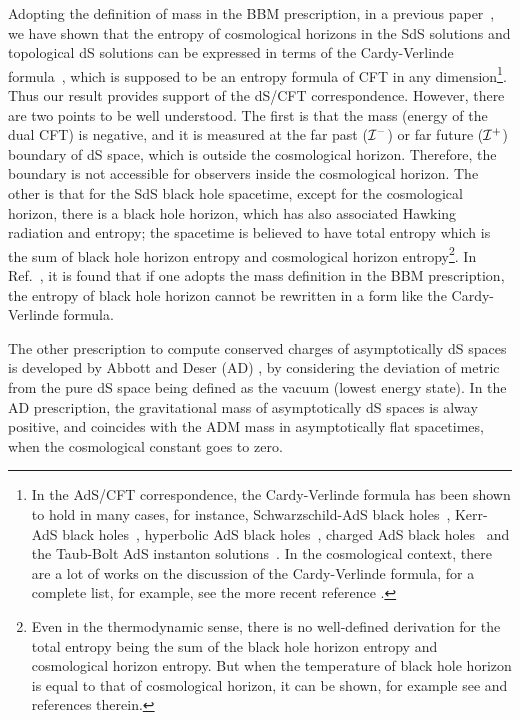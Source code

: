 \documentclass[a4paper,12pt]{article}
\begin{document}
Adopting the definition of mass in the BBM prescription, in a previous paper~\cite{Cai1},
we have shown that the entropy of cosmological horizons in the SdS  solutions
and topological dS solutions can be expressed in terms of the Cardy-Verlinde 
formula~\cite{Verl}, which is supposed to be an entropy formula of CFT in any 
dimension\footnote{In the AdS/CFT correspondence, the Cardy-Verlinde formula has
been shown to hold in many cases, for instance, Schwarzschild-AdS black holes~\cite{Verl},
Kerr-AdS black holes~\cite{Klem2}, hyperbolic AdS black holes~\cite{Cai2}, charged AdS
black holes~\cite{Cai2} and the Taub-Bolt AdS instanton solutions~\cite{Birm}. In the
cosmological context, there are a lot of works on the discussion of the Cardy-Verlinde
formula, for a complete list, for example, see the more recent reference \cite{Myung1}.}.
Thus our result provides support of the dS/CFT correspondence. However, there are two
points to be well understood. The first is that the mass (energy of the dual CFT) is 
negative, and it is measured at the far past (${\cal I}^-$) or far future (${\cal I}^+$)
 boundary of dS space, which is outside the cosmological horizon. Therefore, the boundary is
not accessible for observers inside the cosmological horizon. The other is that for 
the SdS black hole spacetime, except for the cosmological horizon,
there is a black hole horizon, which has also associated  Hawking radiation and 
entropy; the spacetime is believed to have total entropy which is the sum of black hole horizon
entropy and cosmological horizon entropy\footnote{Even in the thermodynamic sense,
there is no well-defined derivation for the total entropy being the sum of the black hole
horizon entropy and cosmological horizon entropy. But when the temperature of black  hole 
horizon is equal to that of cosmological horizon, it can be shown,
for example see \cite{CJS} and references therein.}. In Ref.~\cite{Cai1}, it is found that
if one  adopts the mass definition in the BBM prescription, the entropy of black hole horizon
cannot be rewritten in a form like the Cardy-Verlinde formula.  
 

The other prescription to compute conserved charges of asymptotically dS spaces is developed
by Abbott and Deser (AD) \cite{AD}, by considering the deviation of metric from the pure
dS space being defined as the vacuum (lowest energy state). In the AD prescription,
 the gravitational
mass of asymptotically dS spaces is alway positive, and coincides with the ADM mass in 
asymptotically flat spacetimes, when the cosmological constant goes to zero.  
\end{document}

